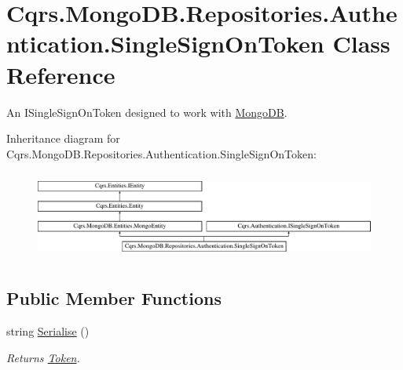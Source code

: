 \hypertarget{classCqrs_1_1MongoDB_1_1Repositories_1_1Authentication_1_1SingleSignOnToken}{}\section{Cqrs.\+Mongo\+D\+B.\+Repositories.\+Authentication.\+Single\+Sign\+On\+Token Class Reference}
\label{classCqrs_1_1MongoDB_1_1Repositories_1_1Authentication_1_1SingleSignOnToken}


An I\+Single\+Sign\+On\+Token designed to work with \hyperlink{namespaceCqrs_1_1MongoDB}{Mongo\+DB}.  


Inheritance diagram for Cqrs.\+Mongo\+D\+B.\+Repositories.\+Authentication.\+Single\+Sign\+On\+Token\+:\begin{figure}[H]
\begin{center}
\leavevmode
\includegraphics[height=2.962963cm]{classCqrs_1_1MongoDB_1_1Repositories_1_1Authentication_1_1SingleSignOnToken}
\end{center}
\end{figure}
\subsection*{Public Member Functions}
\begin{DoxyCompactItemize}
\item 
string \hyperlink{classCqrs_1_1MongoDB_1_1Repositories_1_1Authentication_1_1SingleSignOnToken_a2392ecdb53f1f2a38a67d80a77f11ba4_a2392ecdb53f1f2a38a67d80a77f11ba4}{Serialise} ()
\begin{DoxyCompactList}\small\item\em Returns \hyperlink{classCqrs_1_1MongoDB_1_1Repositories_1_1Authentication_1_1SingleSignOnToken_abf59456bf30dd139620ed6de3ee11e74_abf59456bf30dd139620ed6de3ee11e74}{Token}. \end{DoxyCompactList}\end{DoxyCompactItemize}
